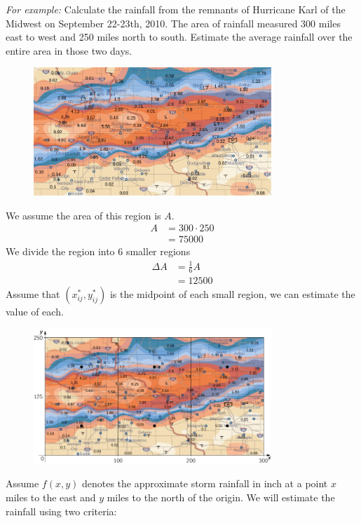 \documentclass[a4paper]{article}
\begin{document}
	\textit{For example: } Calculate the rainfall from the remnants of Hurricane Karl of the Midwest on September 22-23th, 2010. The area of rainfall measured 300 miles east to west and 250 miles north to south. Estimate the average rainfall over the entire area in those two days.
	\begin{figure}[H]
		\centering
		\includegraphics[width=0.8\textwidth]{rain1.png}
	\end{figure}
	We assume the area of this region is $A$.
	\begin{align*}
	A & = 300 \cdot 250 \\
	& = 75000
	\end{align*}
	We divide the region into 6 smaller regions
	\begin{align*}
	\Delta A & = \frac{1}{6}A \\
	& = 12500
	\end{align*}
	Assume that $(x_{ij}^{*}, y_{ij}^{*})$ is the midpoint of each small region, we can estimate the value of each.
	\begin{figure}[H]
		\centering
		\includegraphics*[width=0.8\textwidth]{rain2.png}
	\end{figure}
	Assume $f(x,y)$ denotes the approximate storm rainfall in inch at a point $x$ miles to the east and $y$ miles to the north of the origin. We will estimate the rainfall using two criteria:
\end{document}
